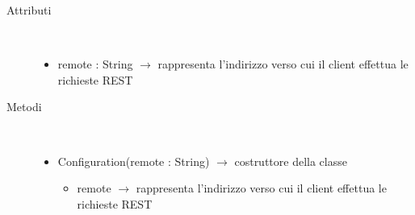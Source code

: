 \begin{description}
\item[Attributi] \hfill \\
\vspace{-7mm}
\begin{itemize}
	\item remote : String $\rightarrow$ rappresenta l'indirizzo verso cui il client effettua le richieste REST
\end{itemize}

\item[Metodi] \hfill \\
\vspace{-7mm}
\begin{itemize}
	\item Configuration(remote : String) $\rightarrow$ costruttore della classe\begin{itemize}
		\item remote $\rightarrow$ rappresenta l'indirizzo verso cui il client effettua le richieste REST
	\end{itemize}
	
\end{itemize}

\end{description}
